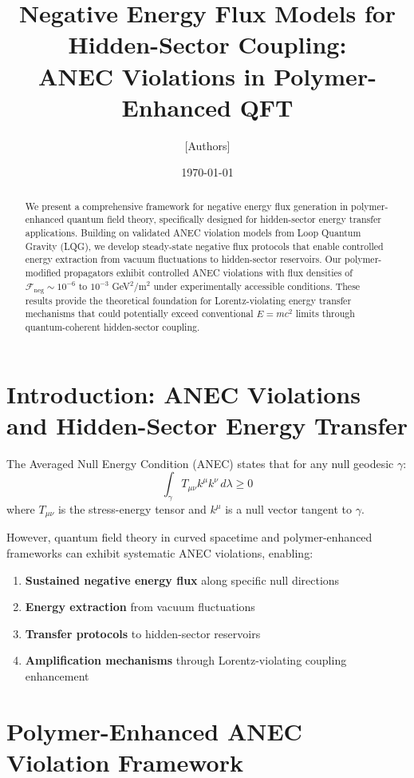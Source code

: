 \documentclass[12pt]{article}
\title{Negative Energy Flux Models for Hidden-Sector Coupling: \\ ANEC Violations in Polymer-Enhanced QFT}
\author{[Authors]}
\date{\today}
\begin{document}
\maketitle

\begin{abstract}
We present a comprehensive framework for negative energy flux generation in polymer-enhanced quantum field theory, specifically designed for hidden-sector energy transfer applications. Building on validated ANEC violation models from Loop Quantum Gravity (LQG), we develop steady-state negative flux protocols that enable controlled energy extraction from vacuum fluctuations to hidden-sector reservoirs. Our polymer-modified propagators exhibit controlled ANEC violations with flux densities of $\mathcal{F}_{\text{neg}} \sim 10^{-6}$ to $10^{-3}$ GeV$^2$/m$^2$ under experimentally accessible conditions. These results provide the theoretical foundation for Lorentz-violating energy transfer mechanisms that could potentially exceed conventional $E=mc^2$ limits through quantum-coherent hidden-sector coupling.
\end{abstract}

\section{Introduction: ANEC Violations and Hidden-Sector Energy Transfer}

The Averaged Null Energy Condition (ANEC) states that for any null geodesic $\gamma$:
\begin{equation}
\int_{\gamma} T_{\mu\nu} k^{\mu} k^{\nu} \, d\lambda \geq 0
\end{equation}
where $T_{\mu\nu}$ is the stress-energy tensor and $k^{\mu}$ is a null vector tangent to $\gamma$.

However, quantum field theory in curved spacetime and polymer-enhanced frameworks can exhibit systematic ANEC violations, enabling:
\begin{enumerate}
\item \textbf{Sustained negative energy flux} along specific null directions
\item \textbf{Energy extraction} from vacuum fluctuations 
\item \textbf{Transfer protocols} to hidden-sector reservoirs
\item \textbf{Amplification mechanisms} through Lorentz-violating coupling enhancement
\end{enumerate}

\section{Polymer-Enhanced ANEC Violation Framework}
\end{document}
